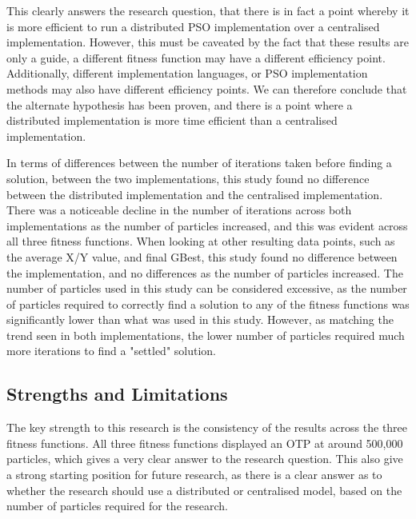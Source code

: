 \documentclass[oneside,12pt]{book}
\begin{document}
This clearly answers the research question, that there is in fact a point whereby it is more efficient to run a distributed PSO implementation over a centralised implementation. However, this must be caveated by the fact that these results are only a guide, a different fitness function may have a different efficiency point. Additionally, different implementation languages, or PSO implementation methods may also have different efficiency points. 
We can therefore conclude that the alternate hypothesis has been proven, and there is a point where a distributed implementation is more time efficient than a centralised implementation. 

In terms of differences between the number of iterations taken before finding a solution, between the two implementations, this study found no difference between the distributed implementation and the centralised implementation. There was a noticeable decline in the number of iterations across both implementations as the number of particles increased, and this was evident across all three fitness functions. When looking at other resulting data points, such as the average X/Y value, and final GBest, this study found no difference between the implementation, and no differences as the number of particles increased. The number of particles used in this study can be considered excessive, as the number of particles required to correctly find a solution to any of the fitness functions was significantly lower than what was used in this study. However, as matching the trend seen in both implementations, the lower number of particles required much more iterations to find a "settled" solution. 

\subsection{Strengths and Limitations}
The key strength to this research is the consistency of the results across the three fitness functions. All three fitness functions displayed an OTP at around 500,000 particles, which gives a very clear answer to the research question. This also give a strong starting position for future research, as there is a clear answer as to whether the research should use a distributed or centralised model, based on the number of particles required for the research. 
\end{document}
